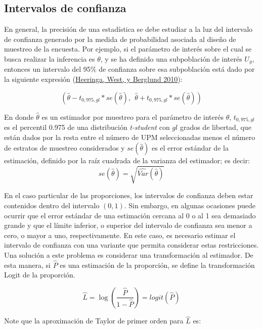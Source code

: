 \documentclass[
  12pt,
  spanish,
]{book}
\begin{document}
\normalsize

\hypertarget{intervalos-de-confianza}{%
\subsection{Intervalos de confianza}\label{intervalos-de-confianza}}

En general, la precisión de una estadística se debe estudiar a la luz del intervalo de confianza generado por la medida de probabilidad asociada al diseño de muestreo de la encuesta. Por ejemplo, si el parámetro de interés sobre el cual se busca realizar la inferencia es \(\theta\), y se ha definido una subpoblación de interés \(U_g\), entonces un intervalo del 95\% de confianza sobre esa subpoblación está dado por la siguiente expresión (\protect\hyperlink{ref-Heeringa_West_Berglund_2010}{Heeringa, West, y Berglund 2010}):

\[
(\hat\theta - t_{0,975, gl} * se(\hat\theta), \ \ \hat\theta + t_{0,975, gl} * se(\hat\theta))
\]

En donde \(\hat\theta\) es un estimador por muestreo para el parámetro de interés \(\theta\), \(t_{0,975, gl}\) es el percentil 0.975 de una distribución \emph{t-student} con \(gl\) grados de libertad, que están dados por la resta entre el número de UPM seleccionadas menos el número de estratos de muestreo considerados y \(se(\hat\theta)\) es el error estándar de la estimación, definido por la raíz cuadrada de la varianza del estimador; es decir:
\[
se(\hat\theta) = \sqrt{\widehat{Var}(\hat\theta)}
\]

En el caso particular de las proporciones, los intervalos de confianza deben estar contenidos dentro del intervalo \((0, 1)\). Sin embargo, en algunas ocasiones puede ocurrir que el error estándar de una estimación cercana al 0 o al 1 sea demasiado grande y que el límite inferior, o superior del intervalo de confianza sea menor a cero, o mayor a uno, respectivamente. En este caso, es necesario estimar el intervalo de confianza con una variante que permita considerar estas restricciones. Una solución a este problema es considerar una transformación al estimador. De esta manera, si \(\hat{P}\) es una estimación de la proporción, se define la transformación Logit de la proporción.

\begin{equation}
\label{L1}
\hat{L} = \log \left(\dfrac{\hat{P}}{1-\hat{P}} \right) = logit(\hat{P})
\end{equation}

Note que la aproximación de Taylor de primer orden para \(\hat{L}\) es:
\end{document}

